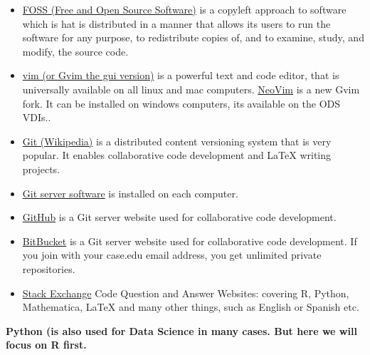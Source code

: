 \documentclass[11pt]{article} %
\begin{document}
      \begin{itemize}
        \item \href{"http://en.wikipedia.org/wiki/Portal:Free_software"}{FOSS (Free and Open Source Software)} is a copyleft approach to software which is hat is distributed in a manner that allows its users to run the software for any purpose, to redistribute copies of, and to examine, study, and modify, the source code. \cite{_portal:free_2014}
        \item \href{"http://www.vim.org/"}{vim (or Gvim the gui version)} is a powerful text and code editor, that is universally available on all linux and mac computers.\cite{_gvim_2014}   \href{"http://neovim.org/"}{NeoVim} is a new Gvim fork.\cite{_neovim_2014} It can be installed on windows computers, its available on the ODS VDIs.. \cite{_gvim_2014}
        \item \href{"http://en.wikipedia.org/wiki/Git_(software)"}{Git (Wikipedia)} is a distributed content versioning system that is very popular. It enables collaborative code development and LaTeX writing projects.\cite{_git_2014-2} 
        \item \href{"http://git-scm.com/"}{Git server software} is installed on each computer.\cite{_git_2014}  
        \item  \href{"https://github.com/"}{GitHub} is a Git server website used for collaborative code development.\cite{_github_2014}
        \item  \href{"https://bitbucket.org/"}{BitBucket} is a Git server website used for collaborative code development. If you join with your case.edu email address, you get unlimited private repositories.\cite{_bitbucket:_2014} 
        \item \href{"http://stackexchange.com/tour"}{Stack Exchange}  \cite{stack_exchange_stack_2014} Code Question and Answer Websites: covering R, Python, Mathematica, {LaTeX} and many other things, such as English or Spanish etc.
      \end{itemize}
      
    {\bf Python (is also used for Data Science in many cases. But here we will focus on R first. } 
\end{document}
